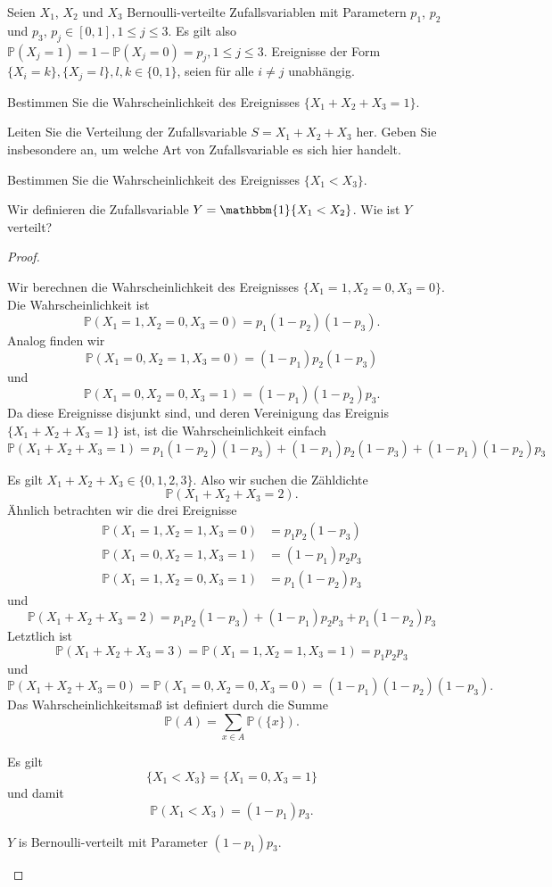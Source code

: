 \begin{Problem}
	Seien $X_1$, $X_2$ und $X_3$ Bernoulli-verteilte Zufallsvariablen mit Parametern $p_1$, $p_2$ und $p_3$, $p_j \in [0, 1], 1 \le j \le 3$. Es gilt also $\mathbb{P}(X_j = 1) = 1 - \mathbb{P}(X_j = 0) = p_j , 1 \le j \le 3$. Ereignisse der Form $\{X_i = k\}, \{X_j = l\}, l, k \in \{0, 1\}$, seien für alle $i \neq j$ unabhängig.
	\begin{parts}
		\item Bestimmen Sie die Wahrscheinlichkeit des Ereignisses $\{X_1 + X_2 + X_3 = 1\}$.
		\item Leiten Sie die Verteilung der Zufallsvariable $S = X_1 +X_2 +X_3$ her. Geben Sie insbesondere an, um welche Art von Zufallsvariable es sich hier handelt.
		\item Bestimmen Sie die Wahrscheinlichkeit des Ereignisses $\{X_1 < X_3\}$.
		\item Wir definieren die Zufallsvariable $Y = \mathbbm{1}\{X_1 < X_2\}$. Wie ist $Y$ verteilt?
	\end{parts}
\end{Problem}
\begin{proof}
	\begin{parts}
		\item Wir berechnen die Wahrscheinlichkeit des Ereignisses $\{X_1=1,X_2=0,X_3=0\}$. Die Wahrscheinlichkeit ist
		\[\mathbb{P}(X_1=1,X_2=0,X_3=0)=p_1(1-p_2)(1-p_3).\]
		Analog finden wir
		\[\mathbb{P}(X_1=0,X_2=1,X_3=0)=(1-p_1)p_2(1-p_3)\]
		und
		\[\mathbb{P}(X_1=0,X_2=0,X_3=1)=(1-p_1)(1-p_2)p_3.\]
		Da diese Ereignisse disjunkt sind, und deren Vereinigung das Ereignis $\{X_1+X_2+X_3=1\}$ ist, ist die Wahrscheinlichkeit einfach
		\[\mathbb{P}(X_1+X_2+X_3=1)=p_1(1-p_2)(1-p_3)+(1-p_1)p_2(1-p_3)+(1-p_1)(1-p_2)p_3\]
		\item Es gilt $X_1+X_2+X_3\in \{0,1,2,3\}$. Also wir suchen die Zähldichte
		\[\mathbb{P}(X_1+X_2+X_3=2).\]
		Ähnlich betrachten wir die drei Ereignisse
		\begin{align*}
			\mathbb{P}(X_1=1,X_2=1,X_3=0)&=p_1p_2(1-p_3)\\
			\mathbb{P}(X_1=0,X_2=1,X_3=1)&=(1-p_1)p_2p_3\\
			\mathbb{P}(X_1=1,X_2=0,X_3=1)&=p_1(1-p_2)p_3
		\end{align*}
		und
		\[\mathbb{P}(X_1+X_2+X_3=2)=p_1p_2(1-p_3)+(1-p_1)p_2p_3+p_1(1-p_2)p_3\]
		Letztlich ist
		\[\mathbb{P}(X_1+X_2+X_3=3)=\mathbb{P}(X_1=1,X_2=1,X_3=1)=p_1p_2p_3\]
		und
		\[\mathbb{P}(X_1+X_2+X_3=0)=\mathbb{P}(X_1=0,X_2=0,X_3=0)=(1-p_1)(1-p_2)(1-p_3).\]
		Das Wahrscheinlichkeitsmaß ist definiert durch die Summe
		\[\mathbb{P}(A)=\sum_{x\in A}\mathbb{P}(\{x\}).\]
		\item Es gilt
		\[\{X_1<X_3\}=\{X_1=0,X_3=1\}\]
		und damit
		\[\mathbb{P}(X_1<X_3)=(1-p_1)p_3.\]
		\item $Y$ is Bernoulli-verteilt mit Parameter $(1-p_1)p_3$.\qedhere
	\end{parts}
\end{proof}
